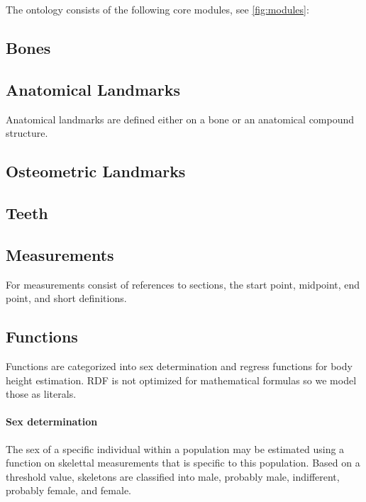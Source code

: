 \documentclass[sw]{iosart2x}
\begin{document}
The ontology consists of the following core modules, see \cref{fig:modules}:
\subsection{Bones}

\subsection{Anatomical Landmarks}
Anatomical landmarks are defined either on a bone or an anatomical compound structure.
\subsection{Osteometric Landmarks}

\subsection{Teeth}
\subsection{Measurements}
For measurements consist of references to sections, the start point, midpoint, end point, and short definitions.

\subsection{Functions}
Functions are categorized into sex determination and regress functions for body height estimation.
RDF is not optimized for mathematical formulas so we model those as literals.

\paragraph{Sex determination}
The sex of a specific individual within a population may be estimated using a function on skelettal measurements that is specific to this population.
Based on a threshold value, skeletons are classified into male, probably male, indifferent, probably female, and female.
\end{document}
